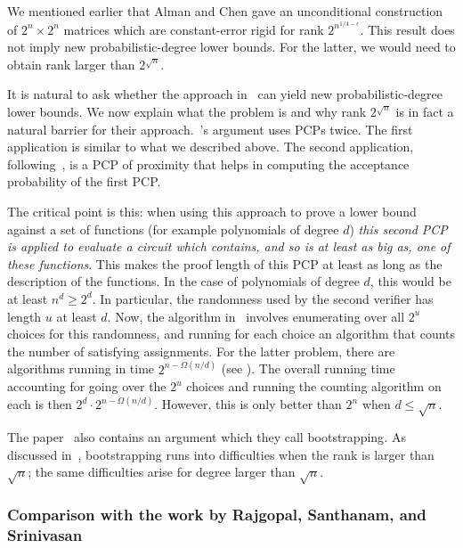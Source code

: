 \documentclass{toc}
\newcommand{\e}{\epsilon}
\begin{document}
We mentioned earlier that Alman and Chen %
\cite{AlmanC19} gave   %
an unconditional construction of $2^{n}\times2^{n}$ matrices which are
constant-error rigid for rank $2^{n^{1/4-\e}}$. This result does
not imply new probabilistic-degree lower bounds. For the latter, we
would need to obtain rank larger than $2^{\sqrt{n}}$.

It is natural to ask whether the approach in~\cite{AlmanC19} can
yield new probabilistic-degree lower bounds. We now explain what the
problem is and why rank $2^{\sqrt{n}}$ is in fact a natural barrier
for their approach.~\cite{AlmanC19}'s argument uses PCPs twice. The
first application is similar to what we described above. The second
application, following~\cite{DBLP:conf/coco/ChenW19}, is a PCP of
proximity that helps in computing the acceptance probability of the
first PCP.

The critical point is this: when using this approach to prove a lower
bound against a set of functions (for example polynomials of degree
$d$) \emph{this second PCP is applied to evaluate a circuit which
contains, and so is at least as big as, one of these functions}. This
makes the proof length of this PCP at least as long as the description
of the functions. In the case of polynomials of degree $d$, this
would be at least $n^{d}\ge2^{d}$. In particular, the randomness
used by the second verifier has length $u$ at least $d$. Now, the
algorithm in~\cite{AlmanC19} involves enumerating over all $2^{u}$
choices for this randomness, and running for each choice an algorithm
that counts the number of satisfying assignments. For the latter problem,
there are algorithms running in time $2^{n-\Omega(n/d)}$ 
(see ). The overall
%
%
%
%
running time  %
accounting for
going over the $2^{u}$ choices and running the counting algorithm
on each is then $2^{d}\cdot2^{n-\Omega(n/d)}.$ However, this is only
better than $2^{n}$ when $d\le\sqrt{n}$.

The paper~\cite{AlmanC19} also contains an argument which they call
bootstrapping\emph{.} As discussed in~\cite{AlmanC19}, bootstrapping
runs into difficulties when the rank is larger than $\sqrt{n}$; the
same difficulties arise for degree larger than $\sqrt{n}.$

\subsubsection{Comparison with the work by Rajgopal, Santhanam, and 
Srinivasan~\cite{DBLP:conf/mfcs/RajgopalS018}}
\end{document}
